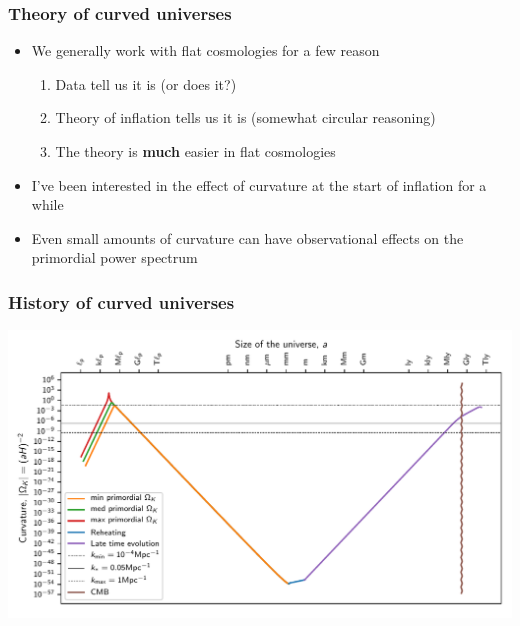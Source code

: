 \documentclass[%
]{beamer}
\begin{document}
\begin{frame}
    \frametitle{Theory of curved universes}
    \begin{itemize}
        \item We generally work with flat cosmologies for a few reason
            \begin{enumerate}
                \item Data tell us it is (or does it?)
                \item Theory of inflation tells us it is (somewhat circular reasoning)
                \item The theory is \textbf{much} easier in flat cosmologies
            \end{enumerate}
        \item I've been interested in the effect of curvature at the start of inflation for a while
        \item Even small amounts of curvature can have observational effects on the primordial power spectrum
    \end{itemize}
\end{frame}


\begin{frame}
    \frametitle{History of curved universes}
    \includegraphics[width=\textwidth]{figures/history.pdf}
\end{frame}
\end{document}
